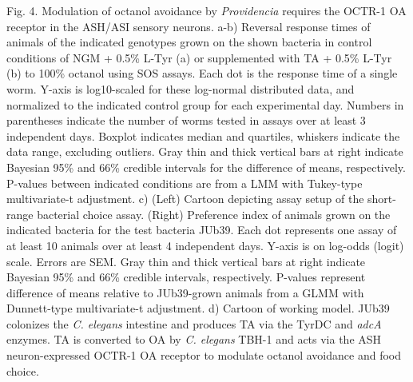 \documentclass[]{article}
\begin{document}
Fig. 4. Modulation of octanol avoidance by \textit{Providencia} requires
the OCTR-1 OA receptor in the ASH/ASI sensory neurons. a-b) Reversal
response times of animals of the indicated genotypes grown on the shown
bacteria in control conditions of NGM + 0.5\% L-Tyr (a) or supplemented
with TA + 0.5\% L-Tyr (b) to 100\% octanol using SOS assays. Each dot is
the response time of a single worm. Y-axis is log10-scaled for these
log-normal distributed data, and normalized to the indicated control
group for each experimental day. Numbers in parentheses indicate the
number of worms tested in assays over at least 3 independent days.
Boxplot indicates median and quartiles, whiskers indicate the data
range, excluding outliers. Gray thin and thick vertical bars at right
indicate Bayesian 95\% and 66\% credible intervals for the difference of
means, respectively. P-values between indicated conditions are from a
LMM with Tukey-type multivariate-t adjustment. c) (Left) Cartoon
depicting assay setup of the short-range bacterial choice assay. (Right)
Preference index of animals grown on the indicated bacteria for the test
bacteria JUb39. Each dot represents one assay of at least 10 animals
over at least 4 independent days. Y-axis is on log-odds (logit) scale.
Errors are SEM. Gray thin and thick vertical bars at right indicate
Bayesian 95\% and 66\% credible intervals, respectively. P-values
represent difference of means relative to JUb39-grown animals from a
GLMM with Dunnett-type multivariate-t adjustment. d) Cartoon of working
model. JUb39 colonizes the \textit{C. elegans} intestine and produces TA
via the TyrDC and \textit{adcA} enzymes. TA is converted to OA by
\textit{C. elegans} TBH-1 and acts via the ASH neuron-expressed OCTR-1
OA receptor to modulate octanol avoidance and food choice.
\end{document}
